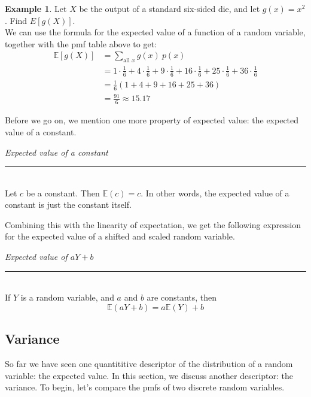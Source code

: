 \documentclass[12pt]{article}
\theoremstyle{definition}
\newtheorem*{example}{Example}
\theoremstyle{remark}
\def\E{{\mathbb E}}
\begin{document}
\begin{example}Let $X$ be the output of a standard six-sided die, and let $g(x) = x^2$. Find $E[g(X)]$.\\

We can use the formula for the expected value of a function of a random variable, together with the pmf table above to get:
\begin{align*}
\E[g(X)] &= \sum_{\text{all }x}g(x)\:p(x) \\
&= 1 \cdot \frac{1}{6} + 4 \cdot \frac{1}{6} + 9\cdot \frac{1}{6} + 16\cdot \frac{1}{6}+25\cdot \frac{1}{6}+36\cdot \frac{1}{6}\\
&= \frac{1}{6}(1 + 4 + 9 + 16 + 25 + 36)\\
&= \frac{91}{6} \approx 15.17
\end{align*}
\end{example}

Before we go on, we mention one more property of expected value: the expected value of a constant.

\begin{framed}
  \emph{Expected value of a constant}\\
  \rule{\dimexpr{}\fboxrule}{.1pt} \\
Let $c$ be a constant. Then $\E(c) = c$. In other words, the expected value of a constant is just the constant itself.
\end{framed}

Combining this with the linearity of expectation, we get the following expression for the expected value of a shifted and scaled random variable.
\begin{framed}
  \emph{Expected value of $aY + b$}\\
  \rule{\dimexpr{}\fboxrule}{.1pt} \\
If $Y$ is a random variable, and $a$ and $b$ are constants, then
\[
\E(aY + b) = a\E(Y) + b
\]
\end{framed}

\subsection{Variance}

So far we have seen one quantititive descriptor of the distribution of a random variable: the expected value. In this section, we discuss another descriptor: the variance. To begin, let's compare the pmfs of two discrete random variables.
\end{document}
